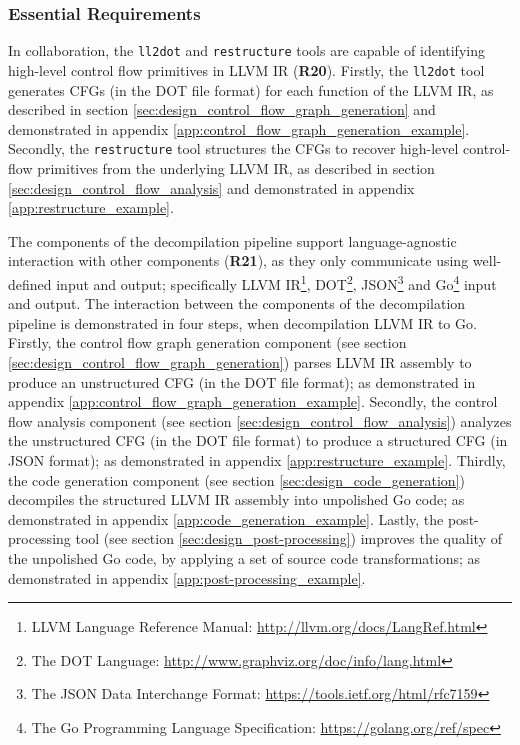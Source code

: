 
\subsubsection{Essential Requirements}
\label{sec:eval_control_flow_analysis_tool_essential_requirements}


In collaboration, the \texttt{ll2dot} and \texttt{restructure} tools are capable of identifying high-level control flow primitives in LLVM IR (\textbf{R20}). Firstly, the \texttt{ll2dot} tool generates CFGs (in the DOT file format) for each function of the LLVM IR, as described in section \ref{sec:design_control_flow_graph_generation} and demonstrated in appendix \ref{app:control_flow_graph_generation_example}. Secondly, the \texttt{restructure} tool structures the CFGs to recover high-level control-flow primitives from the underlying LLVM IR, as described in section \ref{sec:design_control_flow_analysis} and demonstrated in appendix \ref{app:restructure_example}.


The components of the decompilation pipeline support language-agnostic interaction with other components (\textbf{R21}), as they only communicate using well-defined input and output; specifically LLVM IR\footnote{LLVM Language Reference Manual: \url{http://llvm.org/docs/LangRef.html}}, DOT\footnote{The DOT Language: \url{http://www.graphviz.org/doc/info/lang.html}}, JSON\footnote{The JSON Data Interchange Format: \url{https://tools.ietf.org/html/rfc7159}} and Go\footnote{The Go Programming Language Specification: \url{https://golang.org/ref/spec}} input and output. The interaction between the components of the decompilation pipeline is demonstrated in four steps, when decompilation LLVM IR to Go. Firstly, the control flow graph generation component (see section \ref{sec:design_control_flow_graph_generation}) parses LLVM IR assembly to produce an unstructured CFG (in the DOT file format); as demonstrated in appendix \ref{app:control_flow_graph_generation_example}. Secondly, the control flow analysis component (see section \ref{sec:design_control_flow_analysis}) analyzes the unstructured CFG (in the DOT file format) to produce a structured CFG (in JSON format); as demonstrated in appendix \ref{app:restructure_example}. Thirdly, the code generation component (see section \ref{sec:design_code_generation}) decompiles the structured LLVM IR assembly into unpolished Go code; as demonstrated in appendix \ref{app:code_generation_example}. Lastly, the post-processing tool (see section \ref{sec:design_post-processing}) improves the quality of the unpolished Go code, by applying a set of source code transformations; as demonstrated in appendix \ref{app:post-processing_example}.

